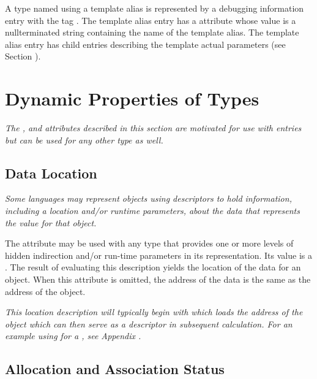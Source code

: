 {A type named using a template alias is represented
by a debugging information entry 
with the tag
\DWTAGtemplatealiasTARG. 
The template alias entry has a
\DWATname{} attribute 
whose value is a null\dash terminated string
containing the name of the template alias.
The template alias entry has child entries describing the template
actual parameters (see Section ).


\section{Dynamic Properties of Types}
\label{chap:dynamicpropertiesoftypes}
\textit{The \DWATdatalocation, \DWATallocated{} and \DWATassociated{}
attributes described in this section are motivated for use with
\DWTAGdynamictype{} entries but can be used for any other type as well.}

\subsection{Data Location}
\label{chap:datalocation}

\textit{Some languages may represent objects using descriptors to hold
information, including a location and/or run\dash time parameters,
about the data that represents the value for that object.}

The\hypertarget{chap:DWATdatalocationindirectiontoactualdata}{}
\DWATdatalocationDEFN{} attribute 
may be used with any type that provides one or more levels of 
hidden indirection
and/or run-time parameters in its representation. Its value
is a . 
The result of evaluating this
description yields the location of the data for an object.
When this attribute is omitted, the address of the data is
the same as the address of the object.

\textit{This location description will typically begin with
\DWOPpushobjectaddress{} 
which loads the address of the
object which can then serve as a descriptor in subsequent
calculation. For an example using 
\DWATdatalocation{} 
for a , see 
Appendix .}

\subsection{Allocation and Association Status}
\label{chap:allocationandassociationstatus}

}
